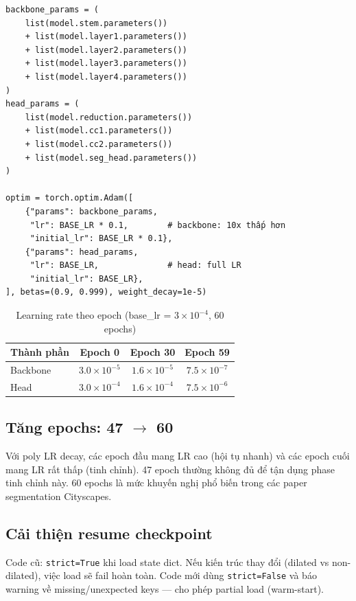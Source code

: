 \documentclass[12pt,a4paper]{article}
\begin{document}
\begin{lstlisting}[caption={Separate learning rate cho backbone và head}]
backbone_params = (
    list(model.stem.parameters())
    + list(model.layer1.parameters())
    + list(model.layer2.parameters())
    + list(model.layer3.parameters())
    + list(model.layer4.parameters())
)
head_params = (
    list(model.reduction.parameters())
    + list(model.cc1.parameters())
    + list(model.cc2.parameters())
    + list(model.seg_head.parameters())
)

optim = torch.optim.Adam([
    {"params": backbone_params,
     "lr": BASE_LR * 0.1,        # backbone: 10x thấp hơn
     "initial_lr": BASE_LR * 0.1},
    {"params": head_params,
     "lr": BASE_LR,              # head: full LR
     "initial_lr": BASE_LR},
], betas=(0.9, 0.999), weight_decay=1e-5)
\end{lstlisting}

\begin{table}[H]
  \centering
  \caption{Learning rate theo epoch (base\_lr = $3\times10^{-4}$, 60 epochs)}
  \begin{tabular}{lccc}
    \toprule
    \textbf{Thành phần} & \textbf{Epoch 0} & \textbf{Epoch 30} & \textbf{Epoch 59} \\
    \midrule
    Backbone & $3.0\times10^{-5}$ & $1.6\times10^{-5}$ & $7.5\times10^{-7}$ \\
    Head     & $3.0\times10^{-4}$ & $1.6\times10^{-4}$ & $7.5\times10^{-6}$ \\
    \bottomrule
  \end{tabular}
\end{table}

\subsection{Tăng epochs: 47 $\rightarrow$ 60}

Với poly LR decay, các epoch đầu mang LR cao (hội tụ nhanh) và các epoch cuối
mang LR rất thấp (tinh chỉnh). 47 epoch thường không đủ để tận dụng phase tinh chỉnh này.
60 epochs là mức khuyến nghị phổ biến trong các paper segmentation Cityscapes.

\subsection{Cải thiện resume checkpoint}

Code cũ: \texttt{strict=True} khi load state dict. Nếu kiến trúc thay đổi
(dilated vs non-dilated), việc load sẽ fail hoàn toàn. Code mới dùng \texttt{strict=False}
và báo warning về missing/unexpected keys — cho phép partial load (warm-start).
\end{document}
